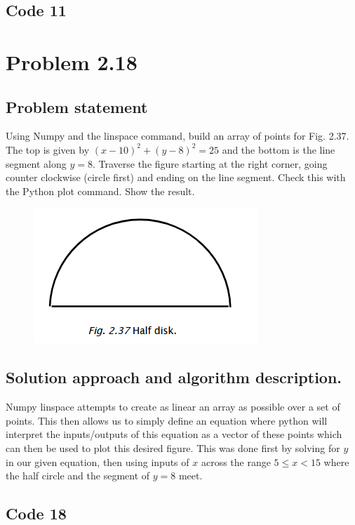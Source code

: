 \documentclass[letterpaper,11pt]{texMemo} %
\begin{document}
\newpage
\subsection*{Code 11}
\begin{tiny}

\end{tiny}

\newpage
\section*{Problem 2.18}
\subsection*{Problem statement}
Using Numpy and the linspace command, build an array of points for Fig. 2.37. The top is given by $(x-10)^2+(y-8)^2=25$
and the bottom is the line segment along $y=8$. Traverse the figure starting at the right corner, going counter clockwise
(circle first) and ending on the line segment. Check this with the Python plot command. Show the result.

\begin{figure}[h]
\centering
\includegraphics{img/fig237.png}
\end{figure}

\subsection*{Solution approach and algorithm description.}
Numpy linspace attempts to create as linear an array as possible over a set of points. This then allows us to simply define 
an equation where python will interpret the inputs/outputs of this equation as a vector of these points which can then be used
to plot this desired figure. This was done first by solving for $y$ in our given equation, then using inputs of $x$ across the
range $5 \leq x < 15 $ where the half circle and the segment of $y=8$ meet.

\subsection*{Code 18}
\begin{tiny}

\end{tiny}
\end{document}
